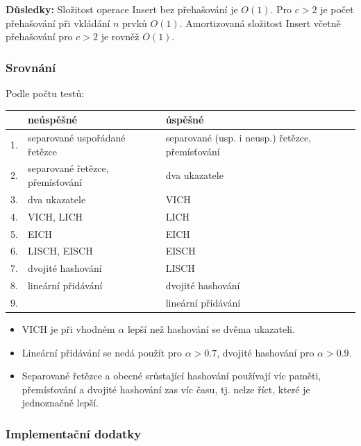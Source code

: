\documentclass[11pt]{report} %
\numberwithin{equation}{section}
\begin{document}
\noindent\textbf{Důsledky:} Složitost operace Insert bez přehašování je $O(1)$. Pro $c > 2$ je počet přehašování při vkládání $n$ prvků $O(1)$. Amortizovaná složitost Insert včetně přehašování pro $c > 2$ je rovněž $O(1)$.

\subsubsection{Srovnání}\label{srovnuxe1nuxed}

Podle počtu testů:

\begin{table}[H]
	\centering
	\begin{tabular}{|l|l|l|}
	\hline
			& neúspěšné & úspěšné \\ \hline
		1. & separované uspořádané řetězce & separované (usp. i neusp.) řetězce,
		přemísťování \\ \hline
		2. & separované řetězce, přemísťování & dva ukazatele \\ \hline
		3. & dva ukazatele & VICH \\ \hline
		4. & VICH, LICH & LICH \\ \hline
		5. & EICH & EICH \\ \hline
		6. & LISCH, EISCH & EISCH \\ \hline
		7. & dvojité hashování & LISCH \\ \hline
		8. & lineární přidávání & dvojité hashování \\ \hline
		9. & & lineární přidávání \\ \hline
	\end{tabular}

\end{table}

\begin{itemize}
	
	\item
	VICH je při vhodném $\alpha$ lepší než hashování se dvěma
	ukazateli.
	\item
	Lineární přidávání se nedá použít pro $\alpha > 0.7$, dvojité
	hashování pro $\alpha > 0.9$.
	\item
	Separované řetězce a obecné srůstající hashování používají víc paměti,
	přemísťování a dvojité hashování zas víc času, tj. nelze říct, které
	je jednoznačně lepší.
\end{itemize}

\subsubsection{Implementační
	dodatky}\label{implementaux10dnuxed-dodatky}
\end{document}
